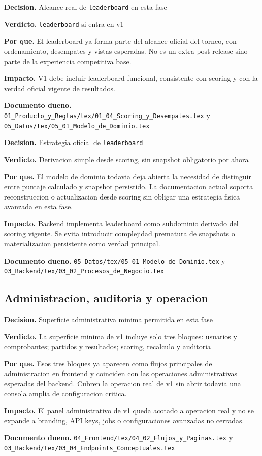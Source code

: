 \begin{docnote}
\textbf{Decision.} Alcance real de \texttt{leaderboard} en esta fase

\textbf{Verdicto.} \texttt{leaderboard} si entra en v1

\textbf{Por que.} El leaderboard ya forma parte del alcance oficial del torneo, con ordenamiento, desempates y vistas esperadas. No es un extra post-release sino parte de la experiencia competitiva base.

\textbf{Impacto.} V1 debe incluir leaderboard funcional, consistente con scoring y con la verdad oficial vigente de resultados.

\textbf{Documento dueno.} \texttt{01\_Producto\_y\_Reglas/tex/01\_04\_Scoring\_y\_Desempates.tex} y \texttt{05\_Datos/tex/05\_01\_Modelo\_de\_Dominio.tex}
\end{docnote}

\begin{docnote}
\textbf{Decision.} Estrategia oficial de \texttt{leaderboard}

\textbf{Verdicto.} Derivacion simple desde scoring, sin snapshot obligatorio por ahora

\textbf{Por que.} El modelo de dominio todavia deja abierta la necesidad de distinguir entre puntaje calculado y snapshot persistido. La documentacion actual soporta reconstruccion o actualizacion desde scoring sin obligar una estrategia fisica avanzada en esta fase.

\textbf{Impacto.} Backend implementa leaderboard como subdominio derivado del scoring vigente. Se evita introducir complejidad prematura de snapshots o materializacion persistente como verdad principal.

\textbf{Documento dueno.} \texttt{05\_Datos/tex/05\_01\_Modelo\_de\_Dominio.tex} y \texttt{03\_Backend/tex/03\_02\_Procesos\_de\_Negocio.tex}
\end{docnote}

\subsection{Administracion, auditoria y operacion}

\begin{docnote}
\textbf{Decision.} Superficie administrativa minima permitida en esta fase

\textbf{Verdicto.} La superficie minima de v1 incluye solo tres bloques: usuarios y comprobantes; partidos y resultados; scoring, recalculo y auditoria

\textbf{Por que.} Esos tres bloques ya aparecen como flujos principales de administracion en frontend y coinciden con las operaciones administrativas esperadas del backend. Cubren la operacion real de v1 sin abrir todavia una consola amplia de configuracion critica.

\textbf{Impacto.} El panel administrativo de v1 queda acotado a operacion real y no se expande a branding, API keys, jobs o configuraciones avanzadas no cerradas.

\textbf{Documento dueno.} \texttt{04\_Frontend/tex/04\_02\_Flujos\_y\_Paginas.tex} y \texttt{03\_Backend/tex/03\_04\_Endpoints\_Conceptuales.tex}
\end{docnote}

